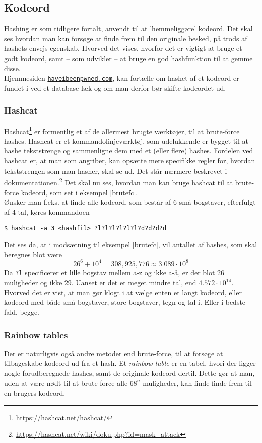 \subsection{Kodeord}\label{kodeord}
Hashing er som tidligere fortalt, anvendt til at 'hemmeliggøre' kodeord.
Det skal ses hvordan man kan forsøge at finde frem til den originale besked, på trods af hashets envejs-egenskab.
Hvorved det vises, hvorfor det er vigtigt at bruge et godt kodeord, samt -- som udvikler -- at bruge en god hashfunktion til at gemme disse.\\
Hjemmesiden \texttt{\href{https://haveibeenpwned.com/Passwords}{haveibeenpwned.com}}, kan fortælle om hashet af et kodeord er fundet i ved et database-læk og om man derfor bør skifte kodeordet ud.


    \subsubsection{Hashcat}
    Hashcat\footnote{\url{https://hashcat.net/hashcat/}} er formentlig et af de allermest brugte værktøjer, til at brute-force hashes.
    Hashcat er et kommandolinjeværktøj, som udelukkende er bygget til at hashe tekststrenge og sammenligne dem med et (eller flere) hashes.
    Fordelen ved hashcat er, at man som angriber, kan opsætte mere specifikke regler for, hvordan tekststrengen som man hasher, skal se ud.
    Det står nærmere beskrevet i dokumentationen.\footnote{\url{https://hashcat.net/wiki/doku.php?id=mask_attack}}
    Det skal nu ses, hvordan man kan bruge hashcat til at brute-force kodeord, som set i eksempel \ref{brutefc}.\\
    Ønsker man f.eks. at finde alle kodeord, som består af 6 små bogstaver, efterfulgt af 4 tal, køres kommandoen
    \begin{verbatim}
$ hashcat -a 3 <hashfil> ?l?l?l?l?l?l?d?d?d?d
    \end{verbatim}
    Det ses da, at i modsætning til eksempel \ref{brutefc}, vil antallet af hashes, som skal beregnes blot være
    \[26^6 + 10^4 = 308,925,776 \approx 3.089 \cdot 10^8\]
    Da \texttt{?l} specificerer et lille bogstav mellem a-z og ikke a-å, er der blot 26 muligheder og ikke 29.
    Uanset er det et meget mindre tal, end \(4.572 \cdot 10^{14}\). Hvorved det er vist, at man gør klogt i at vælge enten et langt kodeord, eller kodeord med både små bogstaver, store bogstaver, tegn og tal i. Eller i bedste fald, begge.\cite{hashcat}

    \subsubsection{Rainbow tables}
    Der er naturligvis også andre metoder end brute-force, til at forsøge at tilbageskabe kodeord ud fra et hash.
    Et \emph{rainbow table} er en tabel, hvori der ligger nogle forudberegnede hashes, samt de originale kodeord dertil.\cite{rainbow}
    Dette gør at man, uden at være nødt til at brute-force alle \(68^n\) muligheder, kan finde finde frem til en brugers kodeord.


